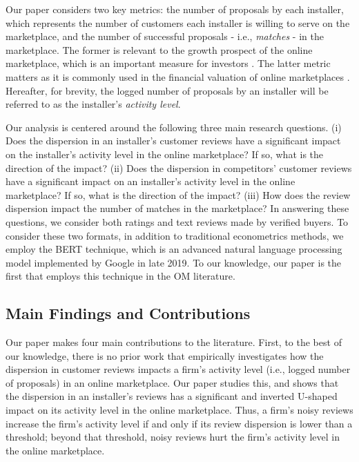 \documentclass[msom,blindrev]{informs3}
\begin{document}
	Our paper considers two key metrics: the number of proposals by each installer, which represents the number of customers each installer is willing to serve on the marketplace, and the number of successful proposals - i.e., \emph{matches} - in the marketplace. The former is relevant to the growth prospect of the online marketplace, which is an important measure for investors \citep{baker}.  The latter metric matters as it is commonly used in the financial valuation of online marketplaces \citep{boris_2018,galston_2017}. Hereafter, for brevity, the logged number of proposals by an installer will be referred to as the installer's \emph{activity level}.
	
	Our analysis is centered around the following three main research questions. (i) Does the dispersion in an installer's customer reviews have a significant impact on the installer's activity level in the online marketplace?  If so, what is the direction of the impact? (ii) Does the dispersion in competitors' customer reviews have a significant impact on an installer's activity level in the online marketplace? If so, what is the direction of the impact? (iii) How does the review dispersion impact the number of matches in the marketplace?  In answering these questions, we consider both  ratings and text reviews made by verified buyers. To consider these two formats, in addition to traditional econometrics methods, we employ the BERT technique, which is an advanced natural language processing model implemented by Google in late 2019. To our knowledge, our paper is the first that employs this technique in the OM literature.
	
\subsection{Main Findings and Contributions}
	
Our paper makes four main contributions to the literature. First, to the best of our knowledge, there is no prior work that empirically investigates how the dispersion in customer reviews impacts a firm's activity level (i.e., logged number of proposals) in an online marketplace. Our paper studies this, and shows that the dispersion in an installer's reviews has a significant and inverted U-shaped impact on its activity level in the online marketplace. Thus, a firm's noisy reviews increase the firm's activity level if and only if its review dispersion is lower than a threshold; beyond that threshold, noisy reviews hurt the firm's activity level in the online marketplace.
	
\end{document}
